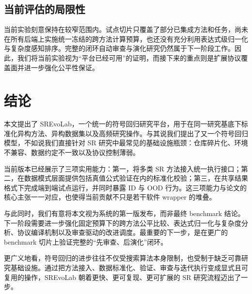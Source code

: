 \documentclass[UTF8]{ctexart}
\begin{document}
\subsection{当前评估的局限性}

当前实验刻意保持在较窄范围内。试点切片只覆盖了部分已集成方法和任务，尚未在所有后端上实施统一冻结的跨方法计算预算，也还没有充分利用表达式级归一化与复杂度感知排序。完整的闭环自动审查与演化研究仍然属于下一阶段工作。因此，我们将当前实验视为“平台已经可用”的证明，而接下来的重点则是扩展协议覆盖面并进一步强化公平性保证。

\section{结论}

本文提出了 SREvoLab，一个统一的符号回归研究平台，用于在同一研究基底下标准化异构方法、异构数据集以及高频研究操作。与其说我们提出了又一个符号回归模型，不如说我们直接针对 SR 研究中最常见的基础设施瓶颈：仓库碎片化、环境不兼容、数据约定不一致以及协议控制薄弱。

当前版本已经展示了三项实用能力：第一，将多类 SR 方法接入统一执行接口；第二，在数据模式层面提供包括真值公式验证在内的标准化校验；第三，在共享结果格式下完成端到端试点运行，并同时暴露 ID 与 OOD 行为。这三项能力与论文的核心主张一一对应，也使得当前贡献不只是若干软件 wrapper 的堆叠。

与此同时，我们有意将本文视为系统的第一版发布，而非最终 benchmark 结论。下一阶段需要进一步强化固定预算下的跨方法公平比较、表达式归一化与复杂度分析、协议编译机制以及审查驱动的改进调度。最重要的下一步，是在更广的 benchmark 切片上验证完整的“先审查、后演化”闭环。

更广义地看，符号回归的进步往往不仅受搜索算法本身限制，也受制于缺乏可靠研究基础设施。通过把方法接入、数据标准化、验证、审查与迭代执行变成显式且可复用的操作，SREvoLab 朝着更快、更可复现、更可扩展的 SR 研究流程迈出了一步。



\end{document}
